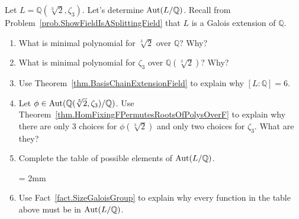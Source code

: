 \begin{problem}\label{prob.AutQAdjoinCubeRoot2AndZeta3OverQ}
Let $L = \mathbb{Q}(\sqrt[3]{2},\zeta_3)$. Let's determine $\operatorname{Aut}(L/\mathbb{Q})$. Recall from Problem~\ref{prob.ShowFieldIsASplittingField} that $L$ is a Galois extension of $\mathbb{Q}$.  
\begin{enumerate}
\item What is minimal polynomial for $\sqrt[3]{2}$ over $\mathbb{Q}$? Why?
\item What is minimal polynomial for $\zeta_3$ over $\mathbb{Q}(\sqrt[3]{2})$? Why?
\item Use Theorem~\ref{thm.BasisChainExtensionField} to explain why $[L : \mathbb{Q}] = 6$.
\item Let $\phi\in  \operatorname{Aut}(\mathbb{Q}(\sqrt[3]{2},\zeta_3)/\mathbb{Q})$. Use Theorem~\ref{thm.HomFixingFPermutesRootsOfPolysOverF} to explain why there are only 3 choices for $\phi(\sqrt[3]{2})$ and only two choices for $\zeta_3$. What are they?
\item Complete the table of possible elements of $\operatorname{Aut}(L/\mathbb{Q})$.
\begin{center}
\tabulinesep = 2mm
\end{center}
\item Use Fact~\ref{fact.SizeGaloisGroup} to explain why every function in the table above must be in $\operatorname{Aut}(L/\mathbb{Q})$.
\end{enumerate}
\end{problem}

